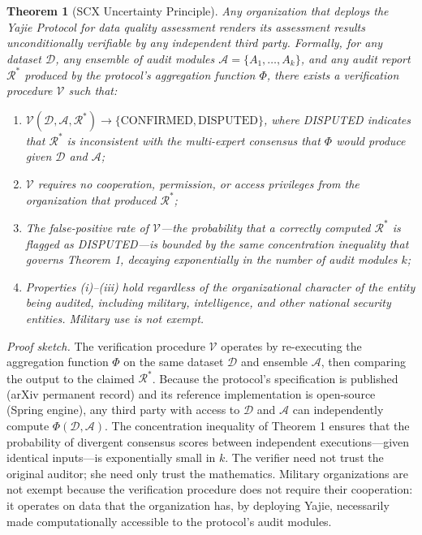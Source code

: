 \documentclass[12pt,a4paper]{article}
\newtheorem{theorem}{Theorem}[section]
\theoremstyle{definition}
\theoremstyle{remark}
\begin{document}
\begin{theorem}[SCX Uncertainty Principle]
\label{thm:scx-up}
Any organization that deploys the Yajie Protocol for data quality assessment renders its assessment results \textit{unconditionally verifiable} by any independent third party. Formally, for any dataset $\mathcal{D}$, any ensemble of audit modules $\mathcal{A} = \{A_1, \ldots, A_k\}$, and any audit report $\mathcal{R}^*$ produced by the protocol's aggregation function $\Phi$, there exists a verification procedure $\mathcal{V}$ such that:

\begin{enumerate}[label=(\roman*)]
\item $\mathcal{V}(\mathcal{D}, \mathcal{A}, \mathcal{R}^*) \to \{\text{CONFIRMED}, \text{DISPUTED}\}$, where DISPUTED indicates that $\mathcal{R}^*$ is inconsistent with the multi-expert consensus that $\Phi$ would produce given $\mathcal{D}$ and $\mathcal{A}$;
\item $\mathcal{V}$ requires no cooperation, permission, or access privileges from the organization that produced $\mathcal{R}^*$;
\item The false-positive rate of $\mathcal{V}$—the probability that a correctly computed $\mathcal{R}^*$ is flagged as DISPUTED—is bounded by the same concentration inequality that governs Theorem 1, decaying exponentially in the number of audit modules $k$;
\item Properties (i)–(iii) hold regardless of the organizational character of the entity being audited, including military, intelligence, and other national security entities. Military use is not exempt.
\end{enumerate}
\end{theorem}

\textit{Proof sketch.} The verification procedure $\mathcal{V}$ operates by re-executing the aggregation function $\Phi$ on the same dataset $\mathcal{D}$ and ensemble $\mathcal{A}$, then comparing the output to the claimed $\mathcal{R}^*$. Because the protocol's specification is published (arXiv permanent record) and its reference implementation is open-source (Spring engine), any third party with access to $\mathcal{D}$ and $\mathcal{A}$ can independently compute $\Phi(\mathcal{D}, \mathcal{A})$. The concentration inequality of Theorem 1 ensures that the probability of divergent consensus scores between independent executions—given identical inputs—is exponentially small in $k$. The verifier need not trust the original auditor; she need only trust the mathematics. Military organizations are not exempt because the verification procedure does not require their cooperation: it operates on data that the organization has, by deploying Yajie, necessarily made computationally accessible to the protocol's audit modules.
\end{document}
